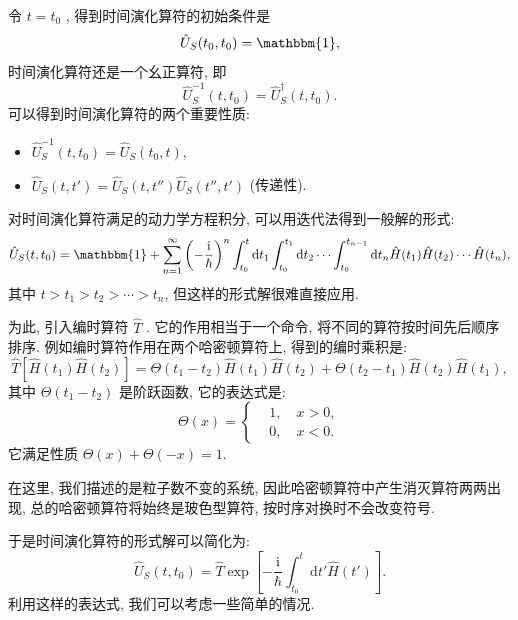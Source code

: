 令 $t=t_0$ , 得到时间演化算符的初始条件是
\begin{equation}
   \hat U_S(t_0, t_0)=\mathbbm{1}, 
\end{equation}
时间演化算符还是一个幺正算符, 即
\begin{equation}
   \hat U_S^{-1}(t, t_0)=\hat U_S^\dagger (t, t_0). 
\end{equation}
可以得到时间演化算符的两个重要性质: 
\begin{itemize}
\item $\hat U_S^{-1}(t, t_0)=\hat U_S(t_0, t)$, 
\item $\hat U_S(t, t')=\hat U_S(t, t'')\hat U_S(t'', t')$ (传递性). 
\end{itemize}

对时间演化算符满足的动力学方程积分, 可以用迭代法得到一般解的形式: 
\begin{equation}
   \hat U_S(t, t_0)=\mathbbm{1}+\sum_{n=1}^{\infty}\left( -\frac{\mathrm{i}}{\hbar} \right)^n \int_{t_0}^t \mathrm dt_1\int_{t_0}^{t_1}\mathrm dt_2\cdots\int_{t_0}^{t_{n-1}}\mathrm dt_n\hat H(t_1)\hat H(t_2)\cdots\hat H(t_n), 
\end{equation}
其中 $t>t_1>t_2>\cdots >t_n$, 但这样的形式解很难直接应用. 

为此, 引入编时算符 $\hat T$ . 它的作用相当于一个命令, 将不同的算符按时间先后顺序排序. 例如编时算符作用在两个哈密顿算符上, 得到的编时乘积是: 
\begin{equation}
   \hat T[\hat H(t_1)\hat H(t_2)]=\Theta(t_1-t_2)\hat H(t_1)\hat H(t_2)+\Theta(t_2-t_1)\hat H(t_2)\hat H(t_1), 
\end{equation}
其中 $\Theta(t_1-t_2)$ 是阶跃函数, 它的表达式是: 
\begin{equation}
   \Theta(x)=\left\{
\begin{aligned}
&1, \quad x>0, \\
&0, \quad x<0. 
\end{aligned}
\right. 
\end{equation}
它满足性质 $\Theta(x)+\Theta(-x)=1$. 

在这里, 我们描述的是粒子数不变的系统, 因此哈密顿算符中产生消灭算符两两出现, 总的哈密顿算符将始终是玻色型算符, 按时序对换时不会改变符号. 

于是时间演化算符的形式解可以简化为: 
\begin{equation}
   \hat U_S(t, t_0)=\hat T\exp\left[ -\frac{\mathrm i}{\hbar}\int_{t_0}^{t}\mathrm dt'\hat H(t') \right]. 
\end{equation}
利用这样的表达式, 我们可以考虑一些简单的情况. 


